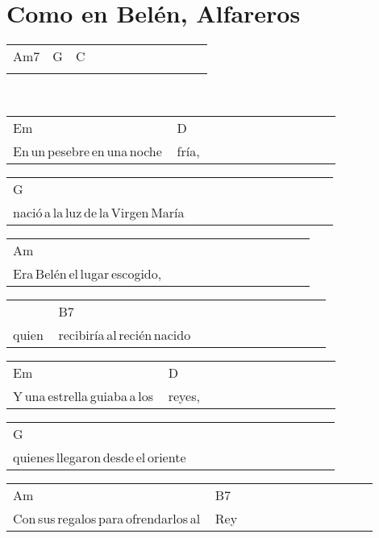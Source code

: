 \section*{Como en Belén, Alfareros\hfill}
\begin{multicols}{2}
\noindent
\begin{minipage}{\columnwidth}
\noindent
\noindent
\begin{tabular}{llllllllllll}
Am7&G&C\\
\quad\quad\quad\quad\quad\quad&\quad\quad\quad\quad&
\end{tabular}
\end{minipage}\\

\noindent
\begin{minipage}{\columnwidth}
\noindent
\noindent
\begin{tabular}{llllllllllll}
Em&D\\
En\,un\,pesebre\,en\,una\,noche\,&fría,
\end{tabular}

\noindent
\begin{tabular}{llllllllllll}
G\\
nació\,a\,la\,luz\,de\,la\,Virgen\,María
\end{tabular}

\noindent
\begin{tabular}{llllllllllll}
Am\\
Era\,Belén\,el\,lugar\,escogido,
\end{tabular}

\noindent
\begin{tabular}{llllllllllll}
&B7\\
quien\,&recibiría\,al\,recién\,nacido
\end{tabular}

\noindent
\begin{tabular}{llllllllllll}
Em&D\\
Y\,una\,estrella\,guiaba\,a\,los\,&reyes,
\end{tabular}

\noindent
\begin{tabular}{llllllllllll}
G\\
quienes\,llegaron\,desde\,el\,oriente
\end{tabular}

\noindent
\begin{tabular}{llllllllllll}
Am&B7\\
Con\,sus\,regalos\,para\,ofrendarlos\,al\,&Rey
\end{tabular}
\end{minipage}\\


\end{multicols}
